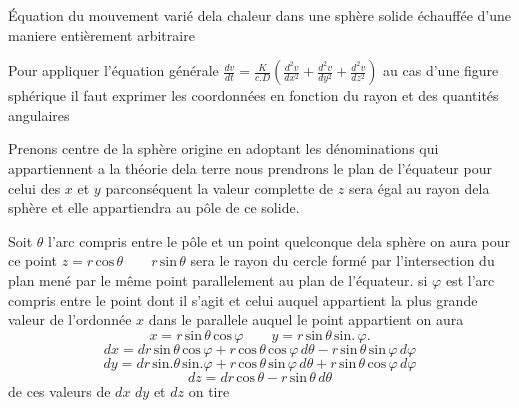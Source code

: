 \documentclass[11pt,a4paper]{article}
\begin{document}
Équation du mouvement varié dela chaleur dans une sphère
solide échauffée d'une maniere entièrement arbitraire

Pour appliquer l'équation générale $\frac{dv}{dt} = \frac{K}{c.D}\left(\frac{d^{2}v}{dx^{2}} + \frac{d^{2}v}{dy^{2}} + \frac{d^{2}v}{dz^{2}}\right)$
au cas d'une figure sphérique il faut exprimer les coordonnées
en fonction du rayon et des  quantités angulaires

Prenons  centre de la sphère  origine
en adoptant les dénominations qui appartiennent a la théorie
dela terre nous prendrons le plan de l'équateur pour
celui des $x$ et $y$ parconséquent la valeur complette
de $z$ sera égal au rayon dela sphère et elle appartiendra
au pôle de ce solide.

Soit $\theta$ l'arc compris entre le pôle et un point
quelconque dela sphère on aura pour ce point
$z = r\,\text{cos}\,\theta \qquad r\,\text{sin}\,\theta$ sera le rayon du cercle formé par
l'intersection du plan mené par le même point parallelement
au plan de l'équateur. si $\varphi$ est l'arc compris entre
le point dont il s'agit et celui auquel appartient
la plus grande valeur de l'ordonnée $x$ dans le parallele
auquel le point appartient on aura
\[ x = r\,\text{sin}\,\theta\,\text{cos}\,\varphi \qquad y = r\,\text{sin}\,\theta\,\text{sin.}\,\varphi. \]
\[ dx = dr\,\text{sin}\,\theta\,\text{cos}\,\varphi + r\,\text{cos}\,\theta\,\text{cos}\,\varphi\,d\theta - r\,\text{sin}\,\theta\,\text{sin}\,\varphi\,d\varphi \]
\[ dy = dr\,\text{sin.}\theta\,\text{sin.}\varphi + r\,\text{cos}\,\theta\,\text{sin}\,\varphi\,d\theta + r\,\text{sin}\,\theta\,\text{cos}\,\varphi\,d\varphi \]
\[ dz = dr\,\text{cos}\,\theta - r\,\text{sin}\,\theta\,d\theta \]
de ces valeurs de $dx$ $dy$ et $dz$ on tire
\end{document}
